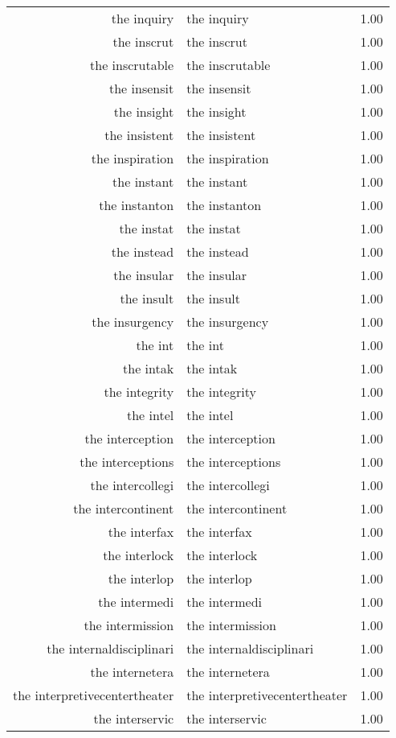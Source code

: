 \begin{table}[ht]
\begin{tabular}{rlr}
  the inquiry & the inquiry & 1.00 \\ 
  the inscrut & the inscrut & 1.00 \\ 
  the inscrutable & the inscrutable & 1.00 \\ 
  the insensit & the insensit & 1.00 \\ 
  the insight & the insight & 1.00 \\ 
  the insistent & the insistent & 1.00 \\ 
  the inspiration & the inspiration & 1.00 \\ 
  the instant & the instant & 1.00 \\ 
  the instanton & the instanton & 1.00 \\ 
  the instat & the instat & 1.00 \\ 
  the instead & the instead & 1.00 \\ 
  the insular & the insular & 1.00 \\ 
  the insult & the insult & 1.00 \\ 
  the insurgency & the insurgency & 1.00 \\ 
  the int & the int & 1.00 \\ 
  the intak & the intak & 1.00 \\ 
  the integrity & the integrity & 1.00 \\ 
  the intel & the intel & 1.00 \\ 
  the interception & the interception & 1.00 \\ 
  the interceptions & the interceptions & 1.00 \\ 
  the intercollegi & the intercollegi & 1.00 \\ 
  the intercontinent & the intercontinent & 1.00 \\ 
  the interfax & the interfax & 1.00 \\ 
  the interlock & the interlock & 1.00 \\ 
  the interlop & the interlop & 1.00 \\ 
  the intermedi & the intermedi & 1.00 \\ 
  the intermission & the intermission & 1.00 \\ 
  the internaldisciplinari & the internaldisciplinari & 1.00 \\ 
  the internetera & the internetera & 1.00 \\ 
  the interpretivecentertheater & the interpretivecentertheater & 1.00 \\ 
  the interservic & the interservic & 1.00 \\ 

\end{tabular}
\end{table}
